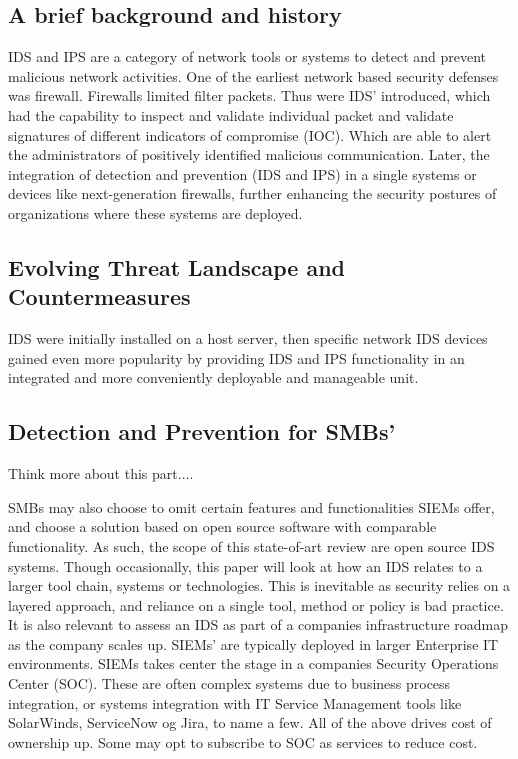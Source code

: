 \subsection{A brief background and history}

IDS and IPS are a category of network tools or systems to detect and prevent malicious network activities. One of the earliest network based security defenses was firewall. Firewalls limited filter packets. Thus were IDS' introduced, which had the capability to inspect and validate individual packet and validate signatures of different indicators of compromise (IOC). Which are able to alert the administrators of positively identified malicious communication. Later, the integration of detection and prevention (IDS and IPS) in a single systems or devices like next-generation firewalls, further enhancing the security postures of organizations where these systems are deployed.

\subsection{Evolving Threat Landscape and Countermeasures}

IDS were initially installed on a host server, then specific network IDS devices gained even more popularity by providing IDS and IPS functionality in an integrated and more conveniently deployable and manageable unit.

\subsection{Detection and Prevention for SMBs'}

\begin{notes}
Think more about this part....
\end{notes}

SMBs may also choose to omit certain features and functionalities SIEMs offer, and choose a solution based on open source software with comparable functionality. As such, the scope of this state-of-art review are open source IDS systems. Though occasionally, this paper will look at how an IDS relates to a larger tool chain, systems or technologies. This is inevitable as security relies on a layered approach, and reliance on a single tool, method or policy is bad practice. It is also relevant to assess an IDS as part of a companies infrastructure roadmap as the company scales up. SIEMs' are typically deployed in larger Enterprise IT environments. SIEMs takes center the stage in a companies Security Operations Center (SOC). These are often complex systems due to business process integration, or systems integration with IT Service Management tools like SolarWinds, ServiceNow og Jira, to name a few. All of the above drives cost of ownership up. Some may opt to subscribe to SOC as services to reduce cost.


